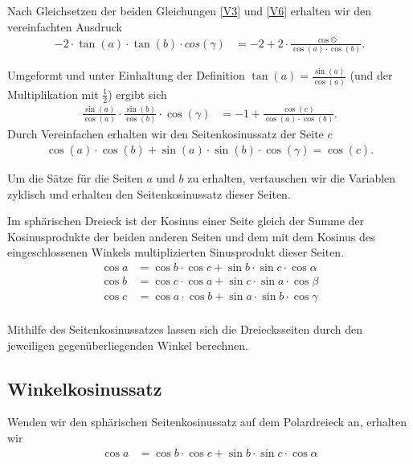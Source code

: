 \begin{refsection}
Nach Gleichsetzen der beiden Gleichungen \eqref{V3} und \eqref{V6} erhalten wir den vereinfachten Ausdruck 
\begin{align*}
-2 \cdot \tan(a) \cdot \tan(b) \cdot cos(\gamma) &= -2+2 \cdot \frac{\cos©}{\cos(a) \cdot \cos(b)}.
\end{align*}


Umgeformt und unter Einhaltung der Definition $\tan(a)=\frac{\sin(a)}{\cos(a)}$ (und der Multiplikation mit $\frac{1}{2}$) ergibt sich
\begin{align*}
\frac{\sin(a)}{\cos(a)} \cdot \frac{\sin(b)}{\cos(b)} \cdot \cos(\gamma) &= -1 + \frac{\cos(c)}{\cos(a) \cdot \cos(b)}.
\end{align*}
Durch Vereinfachen erhalten wir den Seitenkosinussatz der Seite $c$
\begin{align*}
\cos(a) \cdot \cos(b) + \sin(a) \cdot \sin(b) \cdot \cos(\gamma) = \cos(c) .
\end{align*}

Um die Sätze für die Seiten $a$ und $b$ zu erhalten, vertauschen wir die Variablen zyklisch und erhalten den Seitenkosinussatz dieser Seiten.

\begin{satz}Im sphärischen Dreieck ist der Kosinus einer Seite gleich der Summe der Kosinusprodukte der beiden anderen Seiten und dem mit dem Kosinus des eingeschlossenen Winkels multiplizierten Sinusprodukt dieser Seiten.
\begin{align*}
{\cos a} &= {\cos b} \cdot {\cos c} + {\sin b} \cdot {\sin c} \cdot {\cos \alpha}\\
{\cos b} &= {\cos c} \cdot {\cos a} + {\sin c} \cdot {\sin a} \cdot {\cos \beta}\\
{\cos c} &= {\cos a} \cdot {\cos b} + {\sin a} \cdot {\sin b} \cdot {\cos \gamma}\\
\end{align*}
\label{skript:kugel:satz:Seitenkosinussatz}
\end{satz}

Mithilfe des Seitenkosinussatzes lassen sich die Dreiecksseiten durch den jeweiligen gegenüberliegenden Winkel berechnen.


\subsection{Winkelkosinussatz}

Wenden wir den sphärischen Seitenkosinussatz auf dem Polardreieck an, erhalten wir
\begin{align*}
{\cos a} &= {\cos b} \cdot {\cos c} + {\sin b} \cdot {\sin c} \cdot {\cos \alpha}
\end{align*}


\end{refsection}
